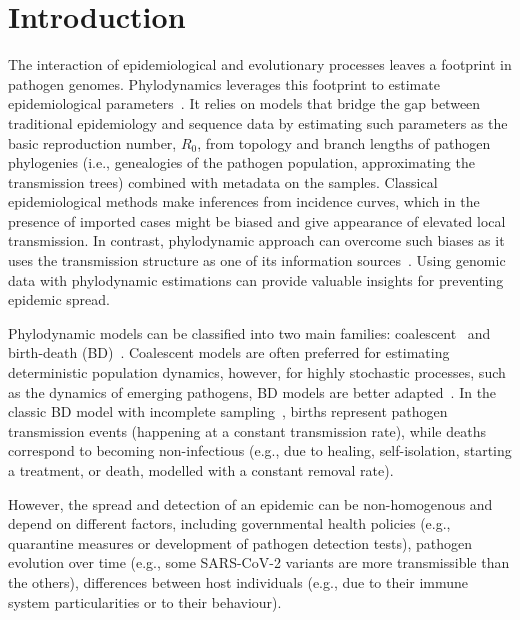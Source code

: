 \documentclass[10pt,letterpaper]{article}
\begin{document}
\linenumbers

\section*{Introduction}
The interaction of epidemiological and evolutionary processes leaves a footprint in pathogen genomes. Phylodynamics leverages this footprint to estimate epidemiological parameters~\cite{Grenfell2004a,Volz2013}. It relies on models that bridge the gap between traditional epidemiology and sequence data by estimating such parameters as the basic reproduction number, $R_0$, from topology and branch lengths of pathogen phylogenies (i.e., genealogies of the pathogen population, approximating the transmission trees) combined with metadata on the samples. Classical epidemiological methods make inferences from incidence curves, which in the presence of imported cases might be biased and give appearance of elevated local transmission. In contrast, phylodynamic approach can overcome such biases as it uses the transmission structure as one of its information sources~\cite{vaughanEstimatesEarlyOutbreakspecific2024}. Using genomic data with phylodynamic estimations can provide valuable insights for preventing epidemic spread.


Phylodynamic models can be classified into two main families:  coalescent~\cite{Volz2009a,Drummond2005,Pybus2000a} and birth-death (BD)~\cite{Kendall1948,Maddison2007,Stadler2009,Stadler2010}. Coalescent models are often preferred for estimating deterministic population dynamics, however, for highly stochastic processes, such as the dynamics of emerging pathogens, BD models are better adapted~\cite{Macpherson2021}. In the classic BD model with incomplete sampling~\cite{Stadler2009}, births represent pathogen transmission events (happening at a constant transmission rate), while deaths correspond to becoming non-infectious (e.g., due to healing, self-isolation, starting a treatment, or death, modelled with a constant removal rate). 

However, the spread and detection of an epidemic can be non-homogenous and depend on different factors, including governmental health policies (e.g., quarantine measures or development of pathogen detection tests), pathogen evolution over time (e.g., some SARS-CoV-2 variants are more transmissible than the others),  differences between host individuals (e.g., due to their immune system particularities or to their behaviour).
\end{document}
